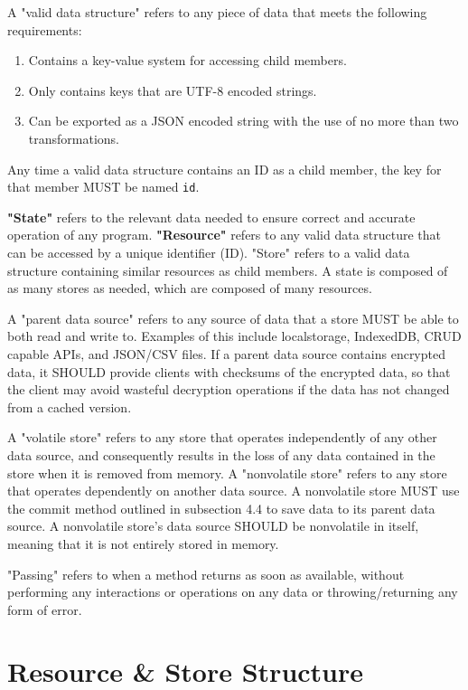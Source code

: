 \documentclass{article}
\begin{document}
A "valid data structure" refers to any piece of data that meets the following requirements:
\begin{enumerate}
    \item Contains a key-value system for accessing child members.
    \item Only contains keys that are UTF-8 encoded strings.
    \item Can be exported as a JSON encoded string with the use of no more than two transformations.
\end{enumerate}
Any time a valid data structure contains an ID as a child member, the key for that member MUST be named \verb|id|.

\textbf{"State"} refers to the relevant data needed to ensure correct and accurate operation of any program. \textbf{"Resource"} refers to any valid data structure that can be accessed by a unique identifier (ID). "Store" refers to a valid data structure containing similar resources as child members. A state is composed of as many stores as needed, which are composed of many resources.

A "parent data source" refers to any source of data that a store MUST be able to both read and write to. Examples of this include localstorage, IndexedDB, CRUD capable APIs, and JSON/CSV files. If a parent data source contains encrypted data, it SHOULD provide clients with checksums of the encrypted data, so that the client may avoid wasteful decryption operations if the data has not changed from a cached version.

A "volatile store" refers to any store that operates independently of any other data source, and consequently results in the loss of any data contained in the store when it is removed from memory. A "nonvolatile store" refers to any store that operates dependently on another data source. A nonvolatile store MUST use the commit method outlined in subsection 4.4 to save data to its parent data source. A nonvolatile store's data source SHOULD be nonvolatile in itself, meaning that it is not entirely stored in memory.

"Passing" refers to when a method returns as soon as available, without performing any interactions or operations on any data or throwing/returning any form of error.

\section{Resource \& Store Structure}
\end{document}
